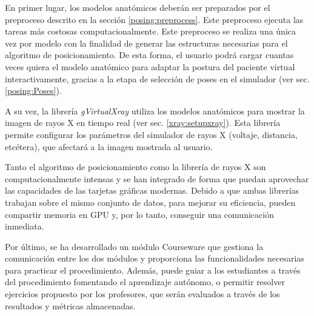 En primer lugar, los modelos anatómicos deberán ser preparados por el preproceso descrito en la sección \ref{posing:preprocess}. Este preproceso ejecuta las tareas más costosas computacionalmente. Este preproceso se realiza una única vez por modelo con la finalidad de generar las estructuras necesarias para el algoritmo de posicionamiento. De esta forma, el usuario podrá cargar cuantas veces quiera el modelo anatómico para adaptar la postura del paciente virtual interactivamente, gracias a la etapa de selección de poses en el simulador (ver sec. \ref{posing:Poses}). 



A su vez, la librería \emph{gVirtualXray} utiliza los modelos anatómicos para mostrar la imagen de rayos X en tiempo real (ver sec. \ref{xray:setupxray}). Esta librería permite configurar los parámetros del simulador de rayos X (voltaje, distancia, etcétera), que afectará a la imagen mostrada al usuario. 

Tanto el algoritmo de posicionamiento como la librería de rayos X son computacionalmente intensas y se han integrado de forma que puedan aprovechar las capacidades de las tarjetas gráficas modernas. Debido a que ambas librerías trabajan sobre el mismo conjunto de datos, para mejorar su eficiencia, pueden compartir memoria en \acs{GPU} y, por lo tanto, conseguir una comunicación inmediata.

Por último, se ha desarrollado un módulo \ac{Courseware} que gestiona la comunicación entre los dos módulos y proporciona las funcionalidades necesarias para practicar el procedimiento. Además, puede guiar a los estudiantes a través del procedimiento fomentando el aprendizaje autónomo, o permitir resolver ejercicios propuesto por los profesores, que serán evaluados a través de los resultados y métricas almacenadas.







